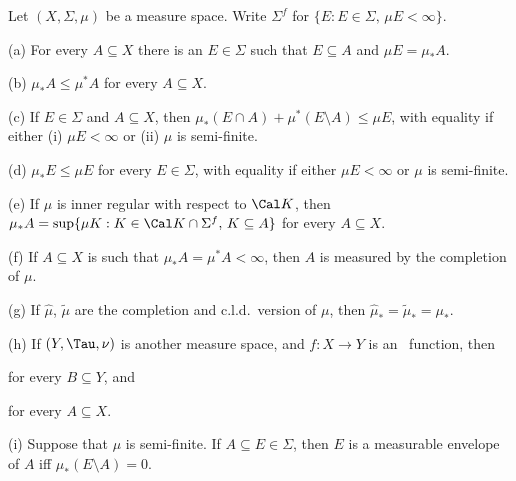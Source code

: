 
 Let $(X,\Sigma,\mu)$ be a measure space.
Write $\Sigma^f$ for $\{E:E\in\Sigma,\,\mu E<\infty\}$.

(a) For every $A\subseteq X$ there is an $E\in\Sigma$ such that
$E\subseteq A$ and $\mu E=\mu_*A$.

(b) $\mu_*A\le\mu^*A$ for every $A\subseteq X$.

(c) If $E\in\Sigma$ and $A\subseteq X$, then
$\mu_*(E\cap A)+\mu^*(E\setminus A)\le\mu E$, with equality if either
(i) $\mu E<\infty$ or (ii) $\mu$ is semi-finite.

(d)  $\mu_*E\le\mu E$ for every $E\in\Sigma$, with
equality if
either $\mu E<\infty$ or $\mu$ is semi-finite.

(e) If $\mu$ is inner regular with respect to $\Cal K$, then
$\mu_*A=\sup\{\mu K:K\in\Cal K\cap\Sigma^f,\,K\subseteq A\}$ for every
$A\subseteq X$.

(f) If $A\subseteq X$ is such that $\mu_*A=\mu^*A<\infty$, then $A$ is
measured by the completion of $\mu$.

(g) If $\hat\mu$, $\tilde\mu$ are the completion and c.l.d.\ version of
$\mu$, then $\hat\mu_*=\tilde\mu_*=\mu_*$.

(h) If $(Y,\Tau,\nu)$ is another measure space, and $f:X\to Y$ is an
\imp\ function, then


\noindent for every $B\subseteq Y$, and


\noindent for every $A\subseteq X$.

(i) Suppose that $\mu$ is semi-finite.   If $A\subseteq E\in\Sigma$,
then $E$ is a measurable envelope of $A$ iff $\mu_*(E\setminus A)=0$.

